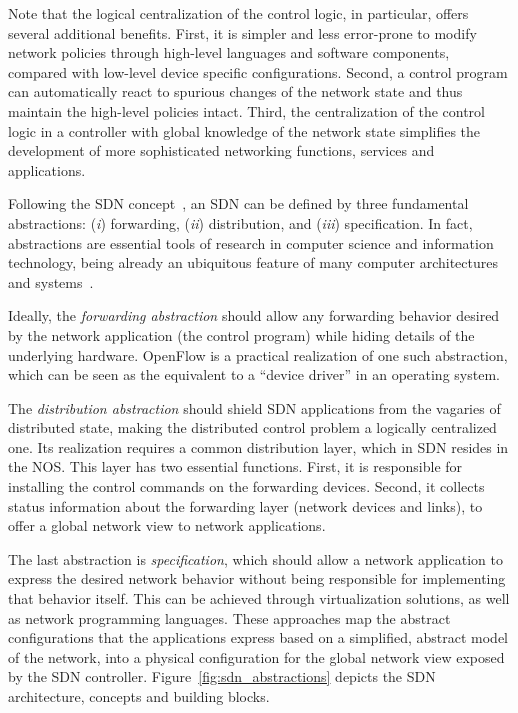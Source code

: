 Note that the logical centralization of the control logic, in particular, offers several 
additional benefits.  First, it is simpler and less error-prone to modify network policies 
through high-level languages and software components, compared with low-level device specific
configurations. Second, a control program can automatically react to spurious changes of the 
network state and thus maintain the high-level policies intact. Third, the centralization of 
the control logic in a controller with global knowledge of the network state simplifies the
development of more sophisticated networking functions, services and applications.

Following the SDN concept~\cite{schenker2011}, an SDN can be defined by 
three fundamental abstractions: (\textit{i}) forwarding, (\textit{ii}) distribution, and 
(\textit{iii}) specification.
In fact, abstractions are essential tools of research in computer science and information technology, being already an ubiquitous feature of many computer architectures and systems~\cite{alkhatib2014}.


Ideally, the \textit{forwarding abstraction} should allow any forwarding behavior desired 
by the network application (the control program) while hiding details of the underlying hardware.
OpenFlow is a practical realization of one such abstraction, which can be seen as the equivalent 
to a ``device driver'' in an operating system.

The \textit{distribution abstraction} should shield SDN applications from the vagaries 
of distributed state, making the distributed control problem a logically centralized one.  Its
realization requires a common distribution layer, which in SDN resides in the NOS. This layer has 
two essential functions. First, it is responsible for installing the control commands on the 
forwarding devices.  Second, it collects status information about the forwarding layer (network 
devices and links), to offer a global network view to network applications.

The last abstraction is \textit{specification}, which should allow a network application to express 
the desired network behavior without being responsible for implementing that behavior itself.
This can be achieved through virtualization solutions, as well as network programming languages.
These approaches map the abstract configurations that the applications express based on a simplified, 
abstract model of the network, into a physical configuration for the global network view exposed by 
the SDN controller. Figure~\ref{fig:sdn_abstractions} depicts the SDN architecture, concepts and 
building blocks.


